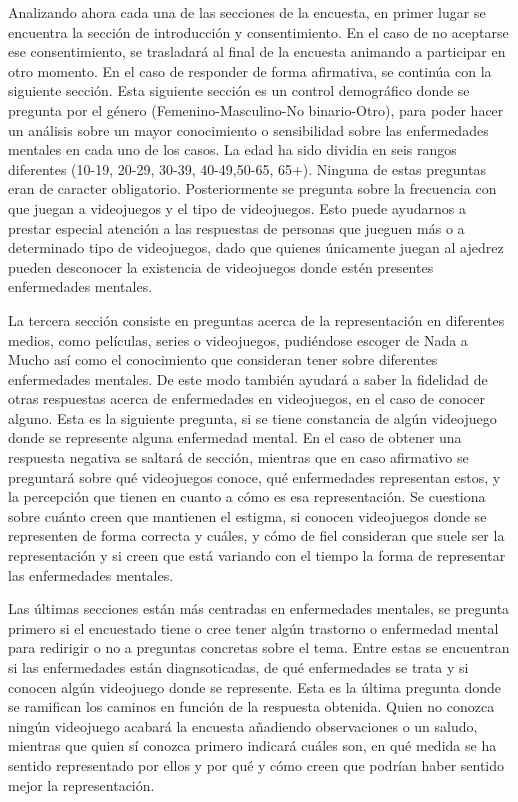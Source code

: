 \documentclass[12pt, a4paper,twoside,titlepage]{book}
\begin{document}
Analizando ahora cada una de las secciones de la encuesta, en primer lugar se encuentra la sección de introducción y consentimiento. En el caso de no aceptarse ese consentimiento, se trasladará al final de la encuesta animando a participar en otro momento. En el caso de responder de forma afirmativa, se continúa con la siguiente sección. Esta siguiente sección es un control demográfico donde se pregunta por el género (Femenino-Masculino-No binario-Otro), para poder hacer un análisis sobre un mayor conocimiento o sensibilidad sobre las enfermedades mentales en cada uno de los casos. La edad ha sido dividia en seis rangos diferentes (10-19, 20-29, 30-39, 40-49,50-65, 65+). Ninguna de estas preguntas eran de caracter obligatorio. Posteriormente se pregunta sobre la frecuencia con que juegan a videojuegos y el tipo de videojuegos. Esto puede ayudarnos a prestar especial atención a las respuestas de personas que jueguen más o a determinado tipo de videojuegos, dado que quienes únicamente juegan al ajedrez pueden desconocer la existencia de videojuegos donde estén presentes enfermedades mentales. 

La tercera sección consiste en preguntas acerca de la representación en diferentes medios, como películas, series o videojuegos, pudiéndose escoger de Nada a Mucho así como el conocimiento que consideran tener sobre diferentes enfermedades mentales. De este modo también ayudará a saber la fidelidad de otras respuestas acerca de enfermedades en videojuegos, en el caso de conocer alguno. Esta es la siguiente pregunta, si se tiene constancia de algún videojuego donde se represente alguna enfermedad mental. En el caso de obtener una respuesta negativa se saltará de sección, mientras que en caso afirmativo se preguntará sobre qué videojuegos conoce, qué enfermedades representan estos, y la percepción que tienen en cuanto a cómo es esa representación. Se cuestiona sobre cuánto creen que mantienen el estigma, si conocen videojuegos donde se representen de forma correcta y cuáles, y cómo de fiel consideran que suele ser la representación y si creen que está variando con el tiempo la forma de representar las enfermedades mentales. 

Las últimas secciones están más centradas en enfermedades mentales, se pregunta primero si el encuestado tiene o cree tener algún trastorno o enfermedad mental para redirigir o no a preguntas concretas sobre el tema. Entre estas se encuentran si las enfermedades están diagnsoticadas, de qué enfermedades se trata y si conocen algún videojuego donde se represente. Esta es la última pregunta donde se ramifican los caminos en función de la respuesta obtenida. Quien no conozca ningún videojuego acabará la encuesta añadiendo observaciones o un saludo, mientras que quien sí conozca primero indicará cuáles son, en qué medida se ha sentido representado por ellos y por qué y cómo creen que podrían haber sentido mejor la representación. 
\end{document}
